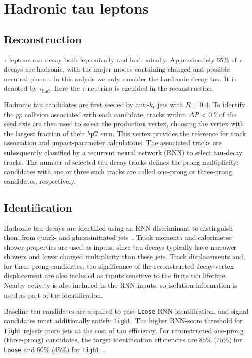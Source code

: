 \section{Hadronic tau leptons}
\label{sec:ch6_tau}

\subsection{Reconstruction}

$\tau$ leptons can decay both leptonically and hadronically.
Approximately 65\% of $\tau$ decays are hadronic, with the major modes containing charged and possible nerutral pions~\cite{ATLAS2022TauR22}.
In this anlysis we only consider the hardronic decay tau. It is denoted by $\tau_{\mathrm{had}}$. Here the $\tau$-neutrino is exculded in the reconstruction.

Hadronic tau candidates are first seeded by anti-$k_t$ jets with $R=0.4$.
To identify the $pp$ collision associated with each candidate, tracks within $\Delta R<0.2$ of the seed axis are then used to select the production vertex, choosing the vertex with the largest fraction of their $\pT$ sum.
This vertex provides the reference for track association and impact-parameter calculations.
The associated tracks are subsequently classified by a recurrent neural network (RNN) to select tau-decay tracks.
The number of selected tau-decay tracks defines the prong multiplicity: candidates with one or three such tracks are called one-prong or three-prong candidates, respectively.

\subsection{Identification}

Hadronic tau decays are identified using an RNN discriminant to distinguish them from quark- and gluon-initiated jets~\cite{ATLAS2019TauRNN,ATLAS2022TauR22}.
Track momenta and calorimeter shower properties are used as inputs, since tau decays typically have narrower showers and lower charged multiplicity than these jets.
Track displacements and, for three-prong candidates, the significance of the reconstructed decay-vertex displacement are also included as inputs sensitive to the finite tau lifetime.
Nearby activity is also included in the RNN inputs, so isolation information is used as part of the identification.

Baseline tau candidates are required to pass \texttt{Loose} RNN identification, and signal candidates must additionally satisfy \texttt{Tight}.
The higher RNN-score threshold for \texttt{Tight} rejects more jets at the cost of tau efficiency.
For reconstructed one-prong (three-prong) candidates, the target identification efficiencies are 85\% (75\%) for \texttt{Loose} and 60\% (45\%) for \texttt{Tight}~\cite{ATLAS2022TauR22}.

